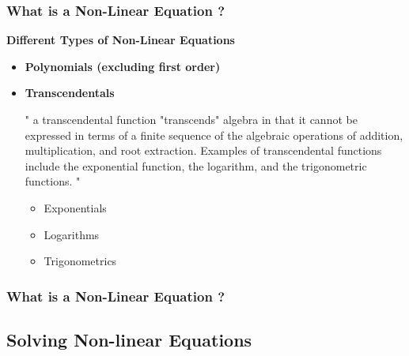 \documentclass[fleqn]{beamer} %
\newcommand{\sectionIsubsectionItitle}{What is a Non-Linear Equation ?}
\newcommand{\sectionIsubsectionIItitle}{Solving Non-linear Equations}
\begin{document}
			\begin{frame}
				\frametitle{\sectionIsubsectionItitle}
				\bigskip

				\textbf{Different Types of Non-Linear Equations }
		
				\begin{itemize}
					\item \textbf{Polynomials (excluding first order)} \vspace{3mm}
					\item \textbf{ Transcendentals} \vspace{2mm}

					{" a transcendental function "transcends" algebra in that it cannot be expressed in terms of a finite sequence of the algebraic operations of addition, multiplication, and root extraction. Examples of transcendental functions include the exponential function, the logarithm, and the trigonometric functions. "}\\
					\begin{itemize}
						\item Exponentials \vspace{1mm}
						\item Logarithms \vspace{1mm}
						\item Trigonometrics \vspace{2mm}
					\end{itemize}

				\end{itemize}

				\btVFill
			\end{frame}

			\begin{frame}
				\frametitle{\sectionIsubsectionItitle}
				\bigskip

				\btVFill
			\end{frame}

		\subsection{\sectionIsubsectionIItitle}\label{sectionIsubsectionII}
\end{document}

